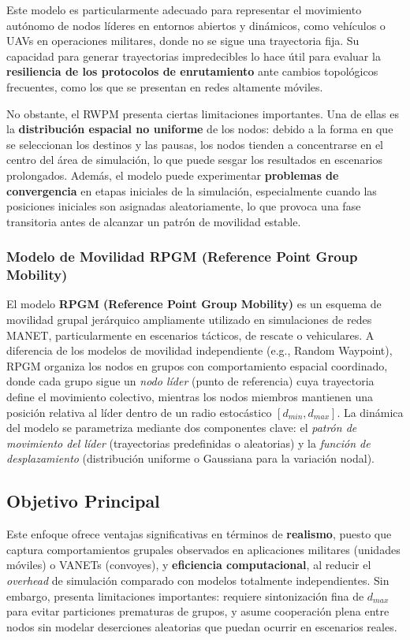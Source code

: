 \documentclass{article}
\begin{document}
Este modelo es particularmente adecuado para representar el movimiento autónomo de nodos líderes en entornos abiertos y dinámicos, como vehículos o UAVs en operaciones militares, donde no se sigue una trayectoria fija. Su capacidad para generar trayectorias impredecibles lo hace útil para evaluar la \textbf{resiliencia de los protocolos de enrutamiento} ante cambios topológicos frecuentes, como los que se presentan en redes altamente móviles.

No obstante, el RWPM presenta ciertas limitaciones importantes. Una de ellas es la \textbf{distribución espacial no uniforme} de los nodos: debido a la forma en que se seleccionan los destinos y las pausas, los nodos tienden a concentrarse en el centro del área de simulación, lo que puede sesgar los resultados en escenarios prolongados. Además, el modelo puede experimentar \textbf{problemas de convergencia} en etapas iniciales de la simulación, especialmente cuando las posiciones iniciales son asignadas aleatoriamente, lo que provoca una fase transitoria antes de alcanzar un patrón de movilidad estable.

\subsubsection{Modelo de Movilidad RPGM (Reference Point Group Mobility)}
El modelo \textbf{RPGM (Reference Point Group Mobility)} es un esquema de movilidad grupal jerárquico ampliamente utilizado en simulaciones de redes MANET, particularmente en escenarios tácticos, de rescate o vehiculares. A diferencia de los modelos de movilidad independiente (e.g., Random Waypoint), RPGM organiza los nodos en grupos con comportamiento espacial coordinado, donde cada grupo sigue un \textit{nodo líder} (punto de referencia) cuya trayectoria define el movimiento colectivo, mientras los nodos miembros mantienen una posición relativa al líder dentro de un radio estocástico $[d_{min}, d_{max}]$. La dinámica del modelo se parametriza mediante dos componentes clave: el \textit{patrón de movimiento del líder} (trayectorias predefinidas o aleatorias) y la \textit{función de desplazamiento} (distribución uniforme o Gaussiana para la variación nodal).

\subsection{Objetivo Principal}
Este enfoque ofrece ventajas significativas en términos de \textbf{realismo}, puesto que captura comportamientos grupales observados en aplicaciones militares (unidades móviles) o VANETs (convoyes), y \textbf{eficiencia computacional}, al reducir el \textit{overhead} de simulación comparado con modelos totalmente independientes. Sin embargo, presenta limitaciones importantes: requiere sintonización fina de $d_{max}$ para evitar particiones prematuras de grupos, y asume cooperación plena entre nodos sin modelar deserciones aleatorias que puedan ocurrir en escenarios reales.
\end{document}
